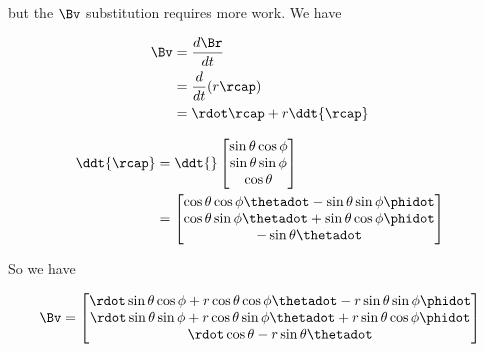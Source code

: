 but the $\Bv$ substitution requires more work.  We have

\begin{align*}
\Bv
&= \frac{d \Br}{dt} \\
&= \frac{d}{dt} (r \rcap) \\
&= \rdot \rcap + r \ddt{\rcap}
\end{align*}

\begin{align*}
\ddt{\rcap}
&=
\ddt{}
\begin{bmatrix}
\sin\theta \cos\phi \\
\sin\theta \sin\phi \\
\cos\theta
\end{bmatrix} \\
&=
\begin{bmatrix}
\cos\theta \cos\phi \thetadot - \sin\theta \sin\phi \phidot \\
\cos\theta \sin\phi \thetadot + \sin\theta \cos\phi \phidot \\
-\sin\theta \thetadot
\end{bmatrix}
\end{align*}

So we have

\begin{equation}\label{eqn:classicalMechanicsPs2:30}
\Bv =
\begin{bmatrix}
\rdot \sin\theta \cos\phi + r \cos\theta \cos\phi \thetadot - r \sin\theta \sin\phi \phidot \\
\rdot \sin\theta \sin\phi + r \cos\theta \sin\phi \thetadot + r \sin\theta \cos\phi \phidot \\
\rdot \cos\theta -r \sin\theta \thetadot
\end{bmatrix}
\end{equation}

